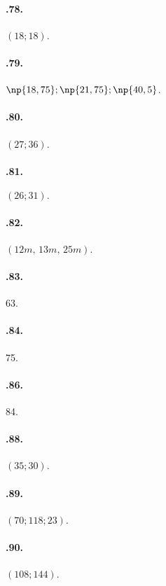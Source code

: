 \begin{multicols}{2}
\paragraph{\thechapter.78.} $(18;18)$.

\paragraph{\thechapter.79.} $\np{18,75}; \np{21,75}; \np{40,5}$.

\paragraph{\thechapter.80.} $(27;36)$.

\paragraph{\thechapter.81.} $(26;31).$

\paragraph{\thechapter.82.} $(12\unit{m}\text{,~}13\unit{m}\text{,~}25\unit{m})$.

\paragraph{\thechapter.83.} 63.

\paragraph{\thechapter.84.} 75.

\paragraph{\thechapter.86.} 84.

\paragraph{\thechapter.88.} $(35;30)$.

\paragraph{\thechapter.89.} $(70;118;23)$.

\paragraph{\thechapter.90.} $(108;144)$.


\end{multicols}
